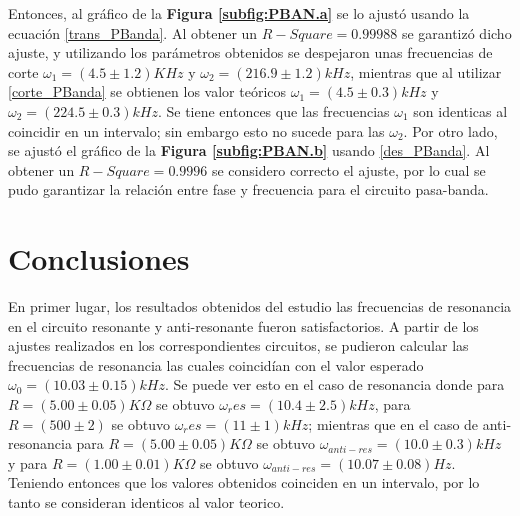 \documentclass[11pt,a4paper]{article}
\begin{document}
Entonces, al gráfico de la \textbf{Figura \ref{subfig:PBAN.a}} se lo ajustó usando la ecuación \eqref{trans_PBanda}. Al obtener un $R-Square= 0.99988$ se garantizó dicho ajuste, y utilizando los parámetros obtenidos se despejaron unas frecuencias de corte $\omega_1 = (4.5 \pm 1.2)KHz$ y $\omega_2 = (216.9 \pm 1.2)kHz$, mientras que al utilizar \eqref{corte_PBanda} se obtienen los valor teóricos $\omega_1 = (4.5 \pm 0.3) kHz$ y $\omega_2 = (224.5 \pm 0.3) kHz$. Se tiene entonces que las frecuencias $\omega_1$ son identicas al coincidir en un intervalo; sin embargo esto no sucede para las $\omega_2$.
Por otro lado, se ajustó el gráfico de la \textbf{Figura \ref{subfig:PBAN.b}} usando \eqref{des_PBanda}. Al obtener un $R-Square = 0.9996$ se considero correcto el ajuste, por lo cual se pudo garantizar la relación entre fase y frecuencia para el circuito pasa-banda.

\label{sec:discusion}




\section{Conclusiones}

En primer lugar, los resultados obtenidos del estudio las frecuencias de resonancia en el circuito resonante y anti-resonante fueron satisfactorios. A partir de los ajustes realizados en los correspondientes circuitos, se pudieron calcular las frecuencias de resonancia las cuales coincidían con el valor esperado $\omega_0 = (10.03 \pm 0.15)kHz$. Se puede ver esto en el caso de resonancia donde para $R=(5.00 \pm 0.05)K\Omega$ se obtuvo $\omega_res = (10.4 \pm 2.5)kHz$, para $R= (500 \pm 2)$  se obtuvo $\omega_res = (11 \pm 1)kHz$; mientras que en el caso de anti-resonancia para $R=(5.00 \pm 0.05)K\Omega$ se obtuvo $\omega_{anti-res} = (10.0 \pm 0.3)kHz$ y para $R=(1.00 \pm 0.01)K\Omega$ se obtuvo $\omega_{anti-res} = (10.07 \pm 0.08)Hz$. Teniendo entonces que los valores obtenidos coinciden en un intervalo, por lo tanto se consideran identicos al valor teorico. 
\end{document}

